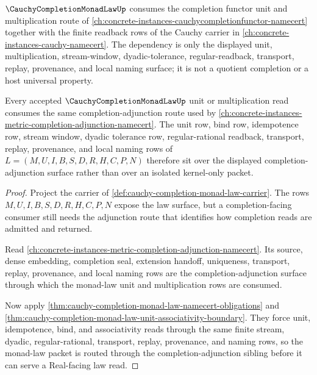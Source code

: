 $\CauchyCompletionMonadLawUp$ consumes the completion functor unit and multiplication route of \autoref{ch:concrete-instances-cauchycompletionfunctor-namecert} together with the finite readback rows of the Cauchy carrier in \autoref{ch:concrete-instances-cauchy-namecert}. The dependency is only the displayed unit, multiplication, stream-window, dyadic-tolerance, regular-readback, transport, replay, provenance, and local naming surface; it is not a quotient completion or a host universal property.

\begin{theorem}
\label{thm:cauchy-completion-monad-law-orphan-route}
Every accepted $\CauchyCompletionMonadLawUp$ unit or multiplication read consumes the same completion-adjunction route used by \autoref{ch:concrete-instances-metric-completion-adjunction-namecert}. The unit row, bind row, idempotence row, stream window, dyadic tolerance row, regular-rational readback, transport, replay, provenance, and local naming rows of $L=(M,U,I,B,S,D,R,H,C,P,N)$ therefore sit over the displayed completion-adjunction surface rather than over an isolated kernel-only packet.
\end{theorem}
\begin{proof}
Project the carrier of \autoref{def:cauchy-completion-monad-law-carrier}. The rows $M,U,I,B,S,D,R,H,C,P,N$ expose the law surface, but a completion-facing consumer still needs the adjunction route that identifies how completion reads are admitted and returned.

Read \autoref{ch:concrete-instances-metric-completion-adjunction-namecert}. Its source, dense embedding, completion seal, extension handoff, uniqueness, transport, replay, provenance, and local naming rows are the completion-adjunction surface through which the monad-law unit and multiplication rows are consumed.

Now apply \autoref{thm:cauchy-completion-monad-law-namecert-obligations} and \autoref{thm:cauchy-completion-monad-law-unit-associativity-boundary}. They force unit, idempotence, bind, and associativity reads through the same finite stream, dyadic, regular-rational, transport, replay, provenance, and naming rows, so the monad-law packet is routed through the completion-adjunction sibling before it can serve a Real-facing law read.
\end{proof}

